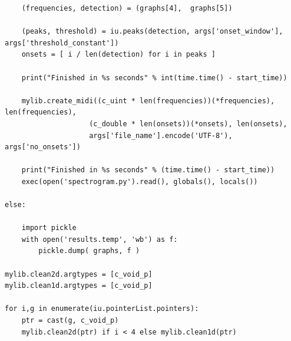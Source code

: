\documentclass[a4paper,12pt]{report}
\begin{document}
\begin{verbatim}
    (frequencies, detection) = (graphs[4],  graphs[5])

    (peaks, threshold) = iu.peaks(detection, args['onset_window'], args['threshold_constant'])
    onsets = [ i / len(detection) for i in peaks ]

    print("Finished in %s seconds" % int(time.time() - start_time))    

    mylib.create_midi((c_uint * len(frequencies))(*frequencies), len(frequencies),
                    (c_double * len(onsets))(*onsets), len(onsets),
                    args['file_name'].encode('UTF-8'), args['no_onsets'])

    print("Finished in %s seconds" % (time.time() - start_time))
    exec(open('spectrogram.py').read(), globals(), locals())

else:

    import pickle
    with open('results.temp', 'wb') as f:
        pickle.dump( graphs, f )

mylib.clean2d.argtypes = [c_void_p]
mylib.clean1d.argtypes = [c_void_p]

for i,g in enumerate(iu.pointerList.pointers):
    ptr = cast(g, c_void_p)
    mylib.clean2d(ptr) if i < 4 else mylib.clean1d(ptr)     
\end{verbatim}
\end{document}
